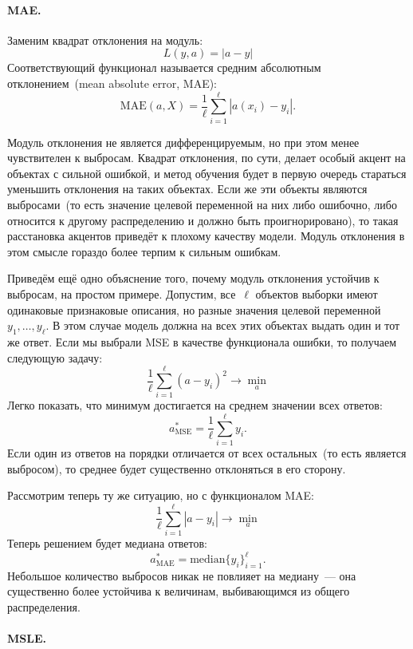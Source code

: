 \documentclass[12pt,fleqn]{article}
\begin{document}
\paragraph{MAE.}

Заменим квадрат отклонения на модуль:
\[
    L(y, a) = |a - y|
\]
Соответствующий функционал называется средним абсолютным отклонением~(mean absolute error, MAE):
\[
    \text{MAE}(a, X)
    =
    \frac{1}{\ell}
    \sum_{i = 1}^{\ell} \left|
        a(x_i) - y_i
    \right|.
\]

Модуль отклонения не является дифференцируемым, но при этом менее чувствителен к выбросам.
Квадрат отклонения, по сути, делает особый акцент на объектах с сильной ошибкой,
и метод обучения будет в первую очередь стараться уменьшить отклонения на таких объектах.
Если же эти объекты являются выбросами~(то есть значение целевой переменной на них либо ошибочно,
либо относится к другому распределению и должно быть проигнорировано),
то такая расстановка акцентов приведёт к плохому качеству модели.
Модуль отклонения в этом смысле гораздо более терпим к сильным ошибкам.

Приведём ещё одно объяснение того, почему модуль отклонения устойчив к выбросам,
на простом примере.
Допустим, все~$\ell$ объектов выборки имеют одинаковые признаковые описания, но разные
значения целевой переменной~$y_1, \dots, y_\ell$.
В этом случае модель должна на всех этих объектах выдать один и тот же ответ.
Если мы выбрали MSE в качестве функционала ошибки, то получаем следующую задачу:
\[
    \frac{1}{\ell}
    \sum_{i = 1}^{\ell} \left(
        a - y_i
    \right)^2
    \to
    \min_a
\]
Легко показать, что минимум достигается на среднем значении всех ответов:
\[
    a_{\text{MSE}}^*
    =
    \frac{1}{\ell}
    \sum_{i = 1}^{\ell}
        y_i.
\]
Если один из ответов на порядки отличается от всех остальных~(то есть является выбросом),
то среднее будет существенно отклоняться в его сторону.

Рассмотрим теперь ту же ситуацию, но с функционалом MAE:
\[
    \frac{1}{\ell}
    \sum_{i = 1}^{\ell} \left|
        a - y_i
    \right|
    \to
    \min_a
\]
Теперь решением будет медиана ответов:
\[
    a_{\text{MAE}}^*
    =
    \text{median}
        \{y_i\}_{i = 1}^{\ell}.
\]
Небольшое количество выбросов никак не повлияет на медиану~--- она существенно
более устойчива к величинам, выбивающимся из общего распределения.

\paragraph{MSLE.}
\end{document}
